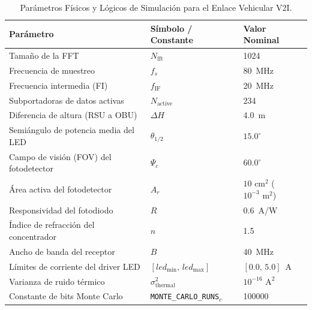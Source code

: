 \begin{table}[htbp]
\centering
\caption{Parámetros Físicos y Lógicos de Simulación para el Enlace Vehicular V2I.}
\label{tab:parametros_simulacion}
\begin{tabular}{|p{5.5cm}|p{3.5cm}|p{3.5cm}|}
\hline
\textbf{Parámetro} & \textbf{Símbolo / Constante} & \textbf{Valor Nominal} \\ \hline
Tamaño de la FFT & $N_{\text{fft}}$ & 1024 \\ \hline
Frecuencia de muestreo & $f_s$ & 80~MHz \\ \hline
Frecuencia intermedia (FI) & $f_{\text{IF}}$ & 20~MHz \\ \hline
Subportadoras de datos activas & $N_{\text{active}}$ & 234 \\ \hline
Diferencia de altura (RSU a OBU) & $\Delta H$ & 4.0~m \\ \hline
Semiángulo de potencia media del LED & $\theta_{1/2}$ & $15.0^\circ$ \\ \hline
Campo de visión (FOV) del fotodetector & $\Psi_c$ & $60.0^\circ$ \\ \hline
Área activa del fotodetector & $A_r$ & $10\text{~cm}^2$ ($10^{-3}\text{~m}^2$) \\ \hline
Responsividad del fotodiodo & $R$ & 0.6~A/W \\ \hline
Índice de refracción del concentrador & $n$ & 1.5 \\ \hline
Ancho de banda del receptor & $B$ & 40~MHz \\ \hline
Límites de corriente del driver LED & $[led_{\text{min}},\, led_{\text{max}}]$ & $[0.0,\, 5.0]$~A \\ \hline
Varianza de ruido térmico & $\sigma^2_{\text{thermal}}$ & $10^{-16}\text{~A}^2$ \\ \hline
Constante de bits Monte Carlo & \texttt{MONTE\_CARLO\_RUNS}$_c$ & 100000 \\ \hline
\end{tabular}
\end{table}

